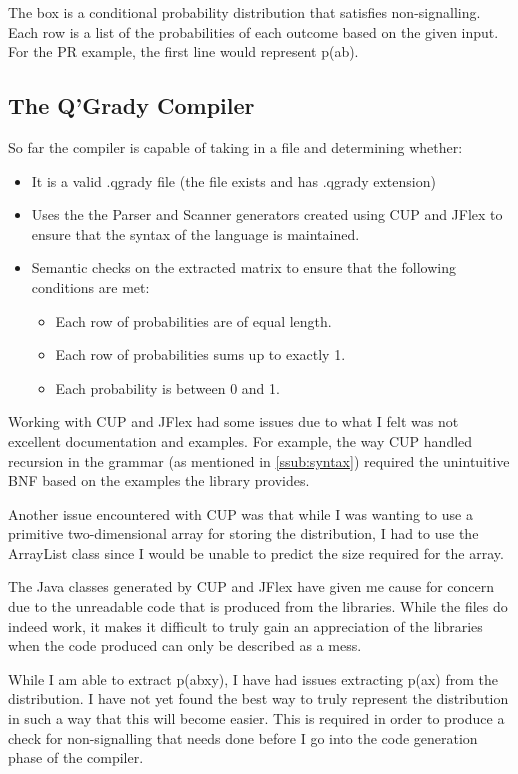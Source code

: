 \documentclass[report.tex]{subfiles}
\begin{document}
The box is a conditional probability distribution that satisfies non-signalling.
Each row is a list of the probabilities of each outcome based on the given
input. For the PR example, the first line would represent p(ab).

\subsection{The Q'Grady Compiler} %
\label{sub:the_q_grady_compiler}
So far the compiler is capable of taking in a file and determining whether:
\begin{itemize}
    \item It is a valid .qgrady file (the file exists and has .qgrady extension)
    \item Uses the the Parser and Scanner generators created using CUP and JFlex
    to ensure that the syntax of the language is maintained.
    \item Semantic checks on the extracted matrix to ensure that the following
    conditions are met:
    \begin{itemize}
        \item Each row of probabilities are of equal length.
        \item Each row of probabilities sums up to exactly 1.
        \item Each probability is between 0 and 1.
    \end{itemize}
\end{itemize}

Working with CUP and JFlex had some issues due to what I felt was not excellent
documentation and examples. For example, the way CUP handled recursion in the
grammar (as mentioned in \ref{ssub:syntax}) required the unintuitive BNF based
on the examples the library provides.

Another issue encountered with CUP was that while I was wanting to use a
primitive two-dimensional array for storing the distribution, I had to use the
ArrayList class since I would be unable to predict the size required for the
array.

The Java classes generated by CUP and JFlex have given me cause for concern due
to the unreadable code that is produced from the libraries. While the files do
indeed work, it makes it difficult to truly gain an appreciation of the
libraries when the code produced can only be described as a mess.

While I am able to extract p(ab\textbar xy), I have had issues extracting
p(a\textbar x) from the distribution. I have not yet found the best way to
truly represent the distribution in such a way that this will become easier.
This is required in order to produce a check for non-signalling that needs done
before I go into the code generation phase of the compiler.
\end{document}
